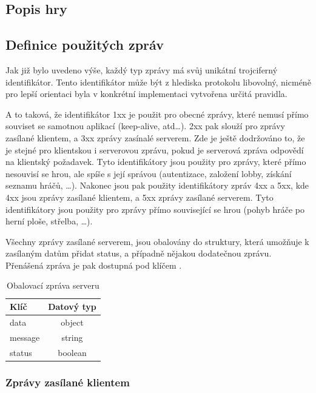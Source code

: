 \documentclass[12pt, a4paper]{article}
\begin{document}
    \subsection{Popis hry}

    \subsection{Definice použitých zpráv}
    Jak již bylo uvedeno výše, každý typ zprávy má svůj unikátní trojciferný identifikátor.
    Tento identifikátor může být z hlediska protokolu libovolný, nicméně pro lepší orientaci byla v konkrétní implementaci vytvořena určitá pravidla.
    
    A to taková, že identifikátor 1xx je použit pro obecné zprávy, které nemusí přímo souviset se samotnou aplikací (keep-alive, atd\dots).
    2xx pak slouží pro zprávy zasílané klientem, a 3xx zprávy zasínalé serverem.
    Zde je ještě dodržováno to, že  je stejné pro klientskou i serverovou zprávu, pokud je serverová zpráva odpovědí na klientský požadavek.
    Tyto identifikátory jsou použity pro zprávy, které přímo nesouvisí se hrou, ale spíše s její správou (autentizace, založení lobby, získání seznamu hráčů, \dots).
    Nakonec jsou pak použity identifikátory zpráv 4xx a 5xx, kde 4xx jsou zprávy zasílané klientem, a 5xx zprávy zasílané serverem. Tyto identifikátory jsou použity pro zprávy přímo související se hrou (pohyb hráče po herní ploše, střelba, \dots).

    Všechny zprávy zasílané serverem, jsou obalovány do struktury, která umožňuje k zasílaným datům přidat status, a případně nějakou dodatečnou zprávu. Přenášená zpráva je pak dostupná pod klíčem .

    \begin{table}[H]
        \centering
        \begin{tabular}{|l|c|}
            \hline
            Klíč & Datový typ\\
            \hline
            \hline
            data & object \\
            \hline
            message & string \\
            \hline
            status & boolean \\
            \hline
        \end{tabular}
        \caption{Obalovací zpráva serveru}
    \end{table}

    \subsubsection{Zprávy zasílané klientem}
\end{document}

